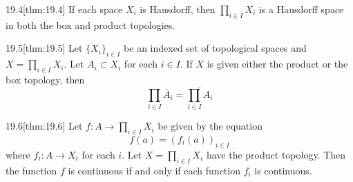 \begin{thmBox}{19.4}[thm:19.4]
    If each space \( X_{ i } \) is Hausdorff, then \( \prod_{ i \in I } 
    X_{ i } \) is a Hausdorff space in both the box and product topologies.

    \baseRule

    \begin{proofBox}

    \end{proofBox}
\end{thmBox}

\begin{thmBox}{19.5}[thm:19.5]
    Let \( \{ X_{ i } \}_{ i \in I } \) be an indexed set of topological spaces
    and \( X = \prod_{ i \in I } X_{ i } \).
    Let \( A_{ i } \subset X_{ i } \) for each \( i \in I \).
    If \( X \) is given either the product or the box topology, then 
    \begin{equation*}
        \prod_{ i \in I } \overline{ A }_{ i }
        =
        \overline{ \prod_{ i \in I } A_{ i } }
    \end{equation*}

    \baseRule

    \begin{proofBox}

    \end{proofBox}
\end{thmBox}

\begin{thmBox}{19.6}[thm:19.6]
    Let \( f: A \rightarrow \prod_{ i \in I } X_{ i } \) be given by the 
    equation
    \begin{equation*}
        f ( a ) 
        =
        ( f_{ i } ( a ) )_{ i \in I }
    \end{equation*}
    where \( f_{ i }: A \rightarrow X_{ i } \) for each \( i \).
    Let \( X = \prod_{ i \in I } X_{ i } \) have the product topology.
    Then the function \( f \) is continuous if and only if each function
    \( f_{ i } \) is continuous.

    \baseRule

    \begin{proofBox}

    \end{proofBox}
\end{thmBox}

